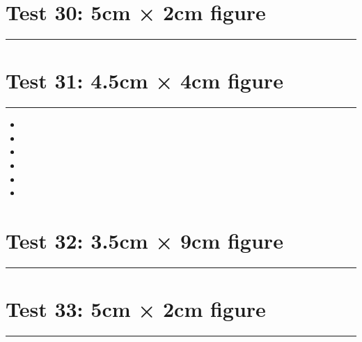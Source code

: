 \documentclass[a4paper,11pt]{article}
\begin{document}
\section*{Test 30: 5cm × 2cm figure}
\begin{swarmwrap}%
  \begin{minipage}[t]{5cm}
    \centering
    \rule{\linewidth}{2cm}
  \end{minipage}%
\end{swarmwrap}%
\swarmwrapnext
\lipsum[41]
\lipsum[42]
\lipsum[43]
\section*{Test 31: 4.5cm × 4cm figure}
\begin{swarmwrap}%
  \begin{minipage}[t]{4cm}
    \centering
    \rule{\linewidth}{4cm}
  \end{minipage}%
\end{swarmwrap}
\begin{itemize}
  \item \swarmwrapnext\lipsum[17][1-4]
  \item \lipsum[19][1-3]
  \item \lipsum[20][1-3]
  \item \lipsum[21][1-3]
  \item \lipsum[22][1-3]
  \item \lipsum[23][1-3]
\end{itemize}
\section*{Test 32: 3.5cm × 9cm figure}
\begin{swarmwrap}%
  \begin{minipage}[t]{3cm}
    \centering
    \rule{\linewidth}{9cm}
  \end{minipage}%
\end{swarmwrap}%
\swarmwrapnext
\lipsum[143]
\lipsum[144]
\lipsum[145]
\lipsum[146]
\lipsum[147]
\section*{Test 33: 5cm × 2cm figure}
\begin{swarmwrap}%
  \begin{minipage}[t]{5cm}
    \centering
    \rule{\linewidth}{2cm}
  \end{minipage}%
\end{swarmwrap}%
\swarmwrapnext
\lipsum[139]
\lipsum[140]
\lipsum[141]
\end{document}

